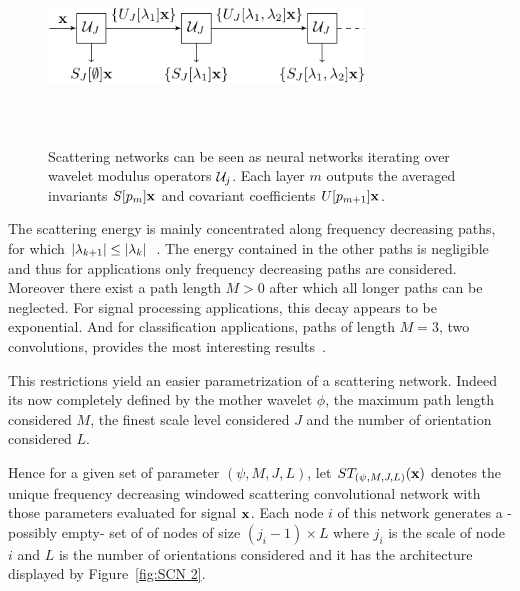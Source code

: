 \documentclass{article}
\begin{document}
    \begin{figure}
      \begin{center}
        \includegraphics[width=3.3in, height=2in, keepaspectratio]{scatnet_crop.pdf}
        \caption[Scattering convolution network.]{\centering  Scattering networks can be seen as neural networks iterating over wavelet  modulus  operators $\mathcal{U}_{j}$. Each layer $m$ outputs the averaged  invariants $S[p_{m}]{\bf x}$ and covariant coefficients $U[p_{m+1}]{\bf x}$.}
        \label{fig:SCN 1}
      \end{center}
      \vspace{-15pt}
    \end{figure}
    
    The scattering energy is mainly concentrated along frequency decreasing paths, \ie for which $\left| \lambda_{k+1} \right| \leq \left| \lambda_{k} \right|$~\cite{mallat2012gis}. The energy contained in the other paths is negligible and thus for applications only frequency decreasing paths are considered. Moreover there exist a path length $M > 0$ after which all longer paths can be neglected. For signal processing applications, this decay appears to be exponential. And for classification applications, paths of length $M = 3$, \ie two convolutions, provides the most interesting results~\cite{anden2011multiscale, bruna2010classification}.
      
    This restrictions yield an easier parametrization of a scattering network. Indeed its now completely defined by the mother wavelet $\phi$, the maximum path length considered $M$, the finest scale level considered $J$ and the number of orientation considered $L$.
      
    Hence for a given set of parameter $(\psi, M,J,L)$, let $ST_{(\psi, M,J,L)}({\bf x})$ denotes the unique frequency decreasing windowed scattering convolutional network with those parameters evaluated for signal ${\bf x}$. Each node $i$ of this network generates a -possibly empty- set of of nodes of size $(j_{i}-1) \times L$ where $j_{i}$ is the scale of node $i$ and $L$ is the number of orientations considered and it has the architecture displayed by Figure~\ref{fig:SCN 2}.
\end{document}
